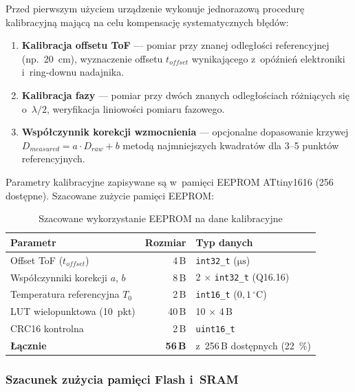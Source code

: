 \documentclass[a4paper,11pt]{article}
\begin{document}
	Przed pierwszym użyciem urządzenie wykonuje jednorazową procedurę kalibracyjną
	mającą na celu kompensację systematycznych błędów:
	
	\begin{enumerate}[nosep]
		\item \textbf{Kalibracja offsetu ToF} --- pomiar przy znanej odległości
		referencyjnej (np.\ \SI{20}{\centi\metre}), wyznaczenie offsetu
		$t_{offset}$ wynikającego z~opóźnień elektroniki i~ring-downu nadajnika.
		\item \textbf{Kalibracja fazy} --- pomiar przy dwóch znanych odległościach
		różniących się o~$\lambda/2$, weryfikacja liniowości pomiaru fazowego.
		\item \textbf{Współczynnik korekcji wzmocnienia} --- opcjonalne dopasowanie
		krzywej $D_{measured} = a \cdot D_{raw} + b$ metodą najmniejszych
		kwadratów dla 3--5 punktów referencyjnych.
	\end{enumerate}
	
	Parametry kalibracyjne zapisywane są w~pamięci EEPROM ATtiny1616
	(\SI{256}{\byte} dostępne). Szacowane zużycie pamięci EEPROM:
	
	\begin{table}[H]
		\centering
		\caption{Szacowane wykorzystanie EEPROM na dane kalibracyjne}
		\label{tab:eeprom_usage}
		\begin{tabular}{lrl}
			\toprule
			\textbf{Parametr} & \textbf{Rozmiar} & \textbf{Typ danych} \\
			\midrule
			Offset ToF ($t_{offset}$) & 4\,B & \texttt{int32\_t} ($\si{\micro\second}$) \\
			Współczynniki korekcji $a$, $b$ & 8\,B & 2 $\times$ \texttt{int32\_t} (Q16.16) \\
			Temperatura referencyjna $T_0$ & 2\,B & \texttt{int16\_t} ($0{,}1\,^\circ$C) \\
			LUT wielopunktowa (10~pkt) & 40\,B & 10 $\times$ 4\,B \\
			CRC16 kontrolna & 2\,B & \texttt{uint16\_t} \\
			\midrule
			\textbf{Łącznie} & \textbf{56\,B} & z~256\,B dostępnych (\SI{22}{\percent}) \\
			\bottomrule
		\end{tabular}
	\end{table}
	
	\subsubsection{Szacunek zużycia pamięci Flash i~SRAM}
	\label{sec:flash_sram}
	
\end{document}
